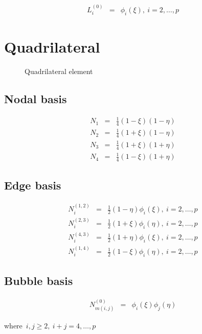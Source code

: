 \begin{eqnarray*}
L_i^{(0)}&=&\phi_i(\xi),\ i=2,\ldots,p
\end{eqnarray*}

\section{Quadrilateral}

\begin{figure}[tbhp]
\begin{center}

\caption{Quadrilateral element}
\end{center}
\end{figure}

\subsection{Nodal basis}

\begin{eqnarray*}
N_1&=&\frac{1}{4}(1-\xi)(1-\eta) \\
N_2&=&\frac{1}{4}(1+\xi)(1-\eta) \\
N_3&=&\frac{1}{4}(1+\xi)(1+\eta) \\
N_4&=&\frac{1}{4}(1-\xi)(1+\eta)
\end{eqnarray*}

\subsection{Edge basis}

\begin{eqnarray*}
N_i^{(1,2)}&=&\frac{1}{2}(1-\eta)\phi_i(\xi), \ i=2,\ldots,p \\
N_i^{(2,3)}&=&\frac{1}{2}(1+\xi)\phi_i(\eta), \ i=2,\ldots,p \\
N_i^{(4,3)}&=&\frac{1}{2}(1+\eta)\phi_i(\xi), \ i=2,\ldots,p \\ 
N_i^{(1,4)}&=&\frac{1}{2}(1-\xi)\phi_i(\eta), \ i=2,\ldots,p
\end{eqnarray*} 

\subsection{Bubble basis}

\begin{eqnarray*}
N_{m(i,j)}^{(0)}&=&\phi_i(\xi)\phi_j(\eta)
\end{eqnarray*}

\noindent where\ $i,j\geq 2,\ i+j=4,\ldots,p$

